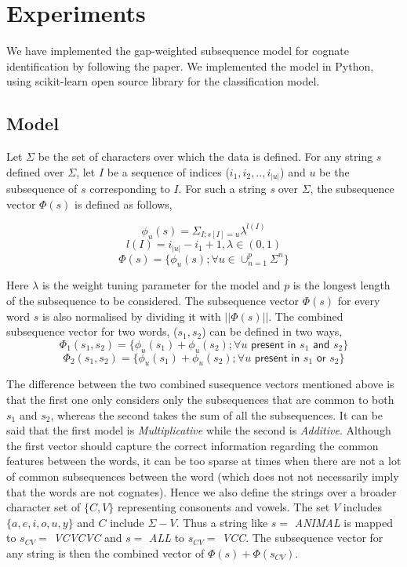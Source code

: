 \documentclass[journal]{IEEEtran}
\begin{document}
\section{Experiments}

We have implemented the gap-weighted subsequence model \cite{rama2015automatic} for cognate identification by following the paper. We implemented the model in Python, using scikit-learn open source library for the classification model. 

\subsection{Model}

Let $\Sigma$ be the set of characters over which the data is defined. For any string $s$ defined over $\Sigma$, let $I$ be a sequence of indices ($i_1, i_2, .., i_{|u|}$) and $u$ be the subsequence of $s$ corresponding to $I$. For such a string \textit{s} over $\Sigma$, the subsequence vector $\Phi(s)$ is defined as follows,

$$\phi_u(s) = \Sigma_{I; s[I] = u}\lambda^{l(I)}$$
$$l(I) = i_{|u|} - i_1 + 1, \lambda \in (0,1)$$
$$\Phi(s) = \{\phi_u(s); \forall u \in \cup_{n=1}^p \Sigma^n\}$$

Here $\lambda$ is the weight tuning parameter for the model and $p$ is the longest length of the subsequence to be considered. The subsequence vector $\Phi(s)$ for every word $s$ is also normalised by dividing it with $||\Phi(s)||$. The combined subsequence vector for two words, ($s_1, s_2$) can be defined in two ways,
$$\Phi_1(s_1, s_2) = \{\phi_u(s_1) + \phi_u(s_2); \forall u \textsf{ present in } s_1 \textsf{ and } s_2\}$$
$$\Phi_2(s_1, s_2) = \{\phi_u(s_1) + \phi_u(s_2); \forall u \textsf{ present in } s_1 \textsf{ or } s_2\}$$

The difference between the two combined susequence vectors mentioned above is that the first one only considers only the subsequences that are common to both $s_1$ and $s_2$, whereas the second takes the sum of all the subsequences. It can be said that the first model is \textit{Multiplicative} while the second is \textit{Additive}. Although the first vector should capture the correct information regarding the common features between the words, it can be too sparse at times when there are not a lot of common subsequences between the word (which does not not necessarily imply that the words are not cognates). Hence we also define the strings over a broader character set of $\{C, V\}$ representing consonents and vowels. The set $V$ includes $\{a, e, i, o, u, y\}$ and $C$ include $\Sigma - V$. Thus a string like $s=$ \textit{ANIMAL} is mapped to $s_{CV}=$ \textit{VCVCVC} and $s=$ \textit{ALL} to $s_{CV}=$ \textit{VCC}. The subsequence vector for any string is then the combined vector of $\Phi(s) + \Phi(s_{CV})$. 
\end{document}
